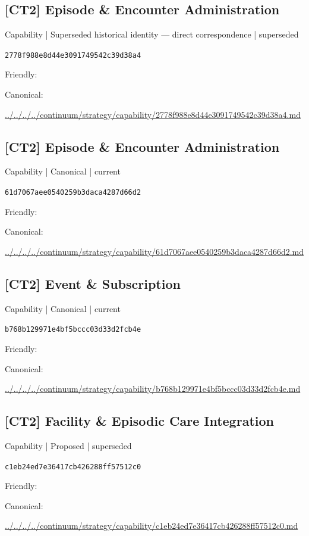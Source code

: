 \documentclass[10pt,a4paper]{article}
\begin{document}
\subsection*{[CT2] Episode \& Encounter Administration}
{\small Capability | Superseded historical identity — direct correspondence | superseded}\par
\texttt{2778f988e8d44e3091749542c39d38a4}\par
Friendly: \par
Canonical: \par
{\footnotesize\url{../../../../continuum/strategy/capability/2778f988e8d44e3091749542c39d38a4.md}}\par
\subsection*{[CT2] Episode \& Encounter Administration}
{\small Capability | Canonical | current}\par
\texttt{61d7067aee0540259b3daca4287d66d2}\par
Friendly: \par
Canonical: \par
{\footnotesize\url{../../../../continuum/strategy/capability/61d7067aee0540259b3daca4287d66d2.md}}\par
\subsection*{[CT2] Event \& Subscription}
{\small Capability | Canonical | current}\par
\texttt{b768b129971e4bf5bccc03d33d2fcb4e}\par
Friendly: \par
Canonical: \par
{\footnotesize\url{../../../../continuum/strategy/capability/b768b129971e4bf5bccc03d33d2fcb4e.md}}\par
\subsection*{[CT2] Facility \& Episodic Care Integration}
{\small Capability | Proposed | superseded}\par
\texttt{c1eb24ed7e36417cb426288ff57512c0}\par
Friendly: \par
Canonical: \par
{\footnotesize\url{../../../../continuum/strategy/capability/c1eb24ed7e36417cb426288ff57512c0.md}}\par
\end{document}
